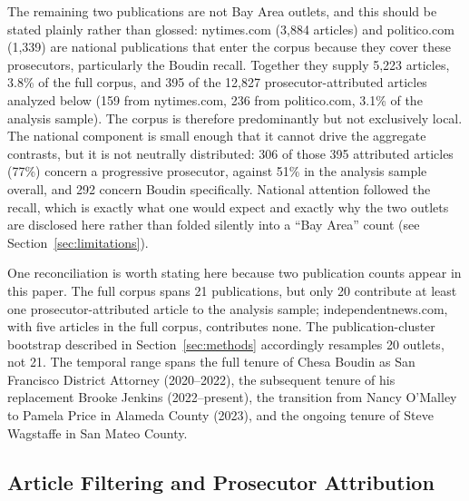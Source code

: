 \documentclass[12pt, letterpaper]{article}
\begin{document}
The remaining two publications are not Bay Area outlets, and this should be stated plainly rather than glossed: nytimes.com (3{,}884 articles) and politico.com (1{,}339) are national publications that enter the corpus because they cover these prosecutors, particularly the Boudin recall. Together they supply 5{,}223 articles, 3.8\% of the full corpus, and 395 of the 12{,}827 prosecutor-attributed articles analyzed below (159 from nytimes.com, 236 from politico.com, 3.1\% of the analysis sample). The corpus is therefore predominantly but not exclusively local. The national component is small enough that it cannot drive the aggregate contrasts, but it is not neutrally distributed: 306 of those 395 attributed articles (77\%) concern a progressive prosecutor, against 51\% in the analysis sample overall, and 292 concern Boudin specifically. National attention followed the recall, which is exactly what one would expect and exactly why the two outlets are disclosed here rather than folded silently into a ``Bay Area'' count (see Section~\ref{sec:limitations}).

One reconciliation is worth stating here because two publication counts appear in this paper. The full corpus spans 21 publications, but only 20 contribute at least one prosecutor-attributed article to the analysis sample; independentnews.com, with five articles in the full corpus, contributes none. The publication-cluster bootstrap described in Section~\ref{sec:methods} accordingly resamples 20 outlets, not 21. The temporal range spans the full tenure of Chesa Boudin as San Francisco District Attorney (2020--2022), the subsequent tenure of his replacement Brooke Jenkins (2022--present), the transition from Nancy O'Malley to Pamela Price in Alameda County (2023), and the ongoing tenure of Steve Wagstaffe in San Mateo County.

\subsection{Article Filtering and Prosecutor Attribution}
\label{sec:attribution}
\end{document}
